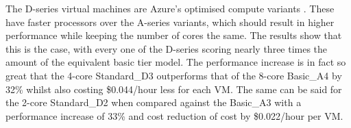 \documentclass[conference]{IEEEtran}
\begin{document}
\begin{table*}[!h]
\begin{adjustbox}{width=\linewidth,center}
  \end{adjustbox}
\end{table*}
%

The D-series virtual machines are Azure's optimised compute variants \cite{azurevmtype}. These have faster processors over the A-series variants, which should result in higher performance while keeping the number of cores the same. The results show that this is the case, with every one of the D-series scoring nearly three times the amount of the equivalent basic tier model. The performance increase is in fact so great that the 4-core Standard\_D3 outperforms that of the 8-core Basic\_A4 by 32\% whilst also costing \$0.044/hour less for each VM. The same can be said for the 2-core Standard\_D2 when compared against the Basic\_A3 with a performance increase of 33\% and cost reduction of cost by \$0.022/hour per VM.
\end{document}

